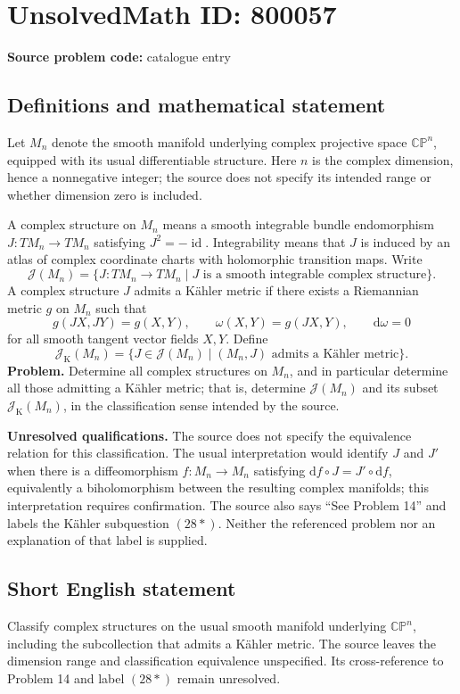 \documentclass[11pt]{article}
\begin{document}
\section*{UnsolvedMath ID: 800057}
\textbf{Source problem code:} catalogue entry
\subsection{Definitions and mathematical statement}
Let \(M_n\) denote the smooth manifold underlying complex projective space \(\mathbb{CP}^{n}\), equipped with its usual differentiable structure. Here \(n\) is the complex dimension, hence a nonnegative integer; the source does not specify its intended range or whether dimension zero is included.

A complex structure on \(M_n\) means a smooth integrable bundle endomorphism \(J:TM_n\to TM_n\) satisfying \(J^2=-\operatorname{id}\). Integrability means that \(J\) is induced by an atlas of complex coordinate charts with holomorphic transition maps. Write
\[
\mathcal{J}(M_n)=\{J:TM_n\to TM_n\mid J\text{ is a smooth integrable complex structure}\}.
\]
A complex structure \(J\) admits a K\"ahler metric if there exists a Riemannian metric \(g\) on \(M_n\) such that
\[
g(JX,JY)=g(X,Y),\qquad \omega(X,Y)=g(JX,Y),\qquad \mathrm{d}\omega=0
\]
for all smooth tangent vector fields \(X,Y\). Define
\[
\mathcal{J}_{\mathrm{K}}(M_n)=\{J\in\mathcal{J}(M_n)\mid (M_n,J)\text{ admits a K\"ahler metric}\}.
\]
\textbf{Problem.} Determine all complex structures on \(M_n\), and in particular determine all those admitting a K\"ahler metric; that is, determine \(\mathcal{J}(M_n)\) and its subset \(\mathcal{J}_{\mathrm{K}}(M_n)\), in the classification sense intended by the source.

\textbf{Unresolved qualifications.} The source does not specify the equivalence relation for this classification. The usual interpretation would identify \(J\) and \(J'\) when there is a diffeomorphism \(f:M_n\to M_n\) satisfying \(\mathrm{d}f\circ J=J'\circ\mathrm{d}f\), equivalently a biholomorphism between the resulting complex manifolds; this interpretation requires confirmation. The source also says ``See Problem 14'' and labels the K\"ahler subquestion \((28*)\). Neither the referenced problem nor an explanation of that label is supplied.
\subsection{Short English statement}
Classify complex structures on the usual smooth manifold underlying \(\mathbb{CP}^{n}\), including the subcollection that admits a K\"ahler metric. The source leaves the dimension range and classification equivalence unspecified. Its cross-reference to Problem 14 and label \((28*)\) remain unresolved.
\end{document}
